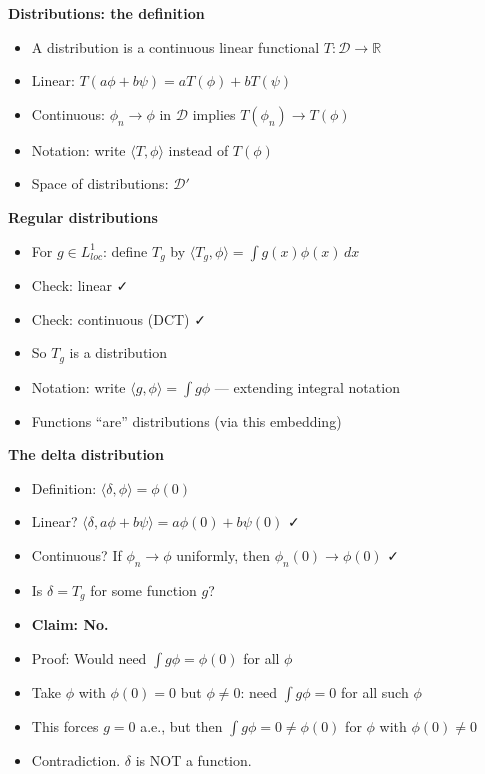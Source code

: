 \documentclass[
  10pt,
  letterpaper,
]{scrbook}
\providecommand{\tightlist}{%
  \setlength{\itemsep}{0pt}\setlength{\parskip}{0pt}}
\begin{document}
\textbf{Distributions: the definition}

\begin{itemize}
\tightlist
\item
  A distribution is a continuous linear functional
  \(T: \mathcal{D} \to \mathbb{R}\)
\item
  Linear: \(T(a\phi + b\psi) = aT(\phi) + bT(\psi)\)
\item
  Continuous: \(\phi_n \to \phi\) in \(\mathcal{D}\) implies
  \(T(\phi_n) \to T(\phi)\)
\item
  Notation: write \(\langle T, \phi \rangle\) instead of \(T(\phi)\)
\item
  Space of distributions: \(\mathcal{D}'\)
\end{itemize}

\textbf{Regular distributions}

\begin{itemize}
\tightlist
\item
  For \(g \in L^1_{loc}\): define \(T_g\) by
  \(\langle T_g, \phi \rangle = \int g(x)\phi(x)\, dx\)
\item
  Check: linear ✓
\item
  Check: continuous (DCT) ✓
\item
  So \(T_g\) is a distribution
\item
  Notation: write \(\langle g, \phi \rangle = \int g\phi\) --- extending
  integral notation
\item
  Functions ``are'' distributions (via this embedding)
\end{itemize}

\textbf{The delta distribution}

\begin{itemize}
\tightlist
\item
  Definition: \(\langle \delta, \phi \rangle = \phi(0)\)
\item
  Linear?
  \(\langle \delta, a\phi + b\psi \rangle = a\phi(0) + b\psi(0)\) ✓
\item
  Continuous? If \(\phi_n \to \phi\) uniformly, then
  \(\phi_n(0) \to \phi(0)\) ✓
\item
  Is \(\delta = T_g\) for some function \(g\)?
\item
  \textbf{Claim: No.}
\item
  Proof: Would need \(\int g\phi = \phi(0)\) for all \(\phi\)
\item
  Take \(\phi\) with \(\phi(0) = 0\) but \(\phi \neq 0\): need
  \(\int g\phi = 0\) for all such \(\phi\)
\item
  This forces \(g = 0\) a.e., but then \(\int g\phi = 0 \neq \phi(0)\)
  for \(\phi\) with \(\phi(0) \neq 0\)
\item
  Contradiction. \(\delta\) is NOT a function.
\end{itemize}
\end{document}
